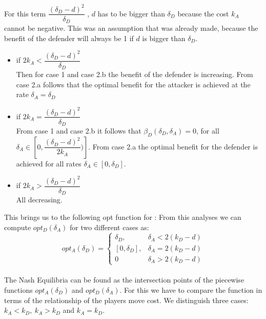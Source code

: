 For this term $\dfrac{(\delta_{D}-d)^{2}}{\delta_{D}} $ , $d$ has to be bigger than  $\delta_{D}$ because the cost $k_{A}$ cannot be negative. This was an assumption that was already made, because the benefit of the defender will always be 1 if $d$ is bigger than  $\delta_{D}$.
\begin{itemize}
\item if $2k_{A} < \dfrac{(\delta_{D}-d)^{2}}{\delta_{D}} $ \\
Then for case 1 and case 2.b the benefit of the defender is increasing. From case 2.a follows that the optimal benefit for the attacker is achieved at the rate $\delta_{A} = \delta_{D}$
\item if $2k_{A} = \dfrac{(\delta_{D}-d)^{2}}{\delta_{D}} $ \\
From case 1 and case 2.b it follows that $\beta_{D}(\delta_{D},\delta_{A})=0$, for all $\delta_{A} \in [0,\dfrac{(\delta_{D}-d)^{2}}{2k_{A}})]$. From case 2.a the optimal benefit for the defender is achieved for all rates $\delta_{A} \in [0, \delta_{D}]$.
\item if $2k_{A} > \dfrac{(\delta_{D}-d)^{2}}{\delta_{D}} $ \\
All decreasing.
\end{itemize}

This brings us to the following opt function for : 
From this analyses we can compute $opt_{D}(\delta_{A})$ for two different cases as:
 \begin{displaymath}
  opt_{A}(\delta_{D}) = \left\{
     \begin{array}{lr}
       \delta_{D}, & \delta_{A} < 2(k_{D} - d)\\
       \left[ 0, \delta_{D} \right],  & \delta_{A} = 2(k_{D} - d) \\
       0 & \delta_{A} > 2(k_{D} - d)
     \end{array}
   \right.
\end{displaymath}
\\

The Nash Equilibria can be found as the intersection points of the piecewise functions $opt_{A}(\delta_{D})$ and $opt_{D}(\delta_{A})$. For this we have to compare the function in terms of the relationship of the players move cost. We distinguish three cases: $k_{A} < k_{D} , ~k_{A} > k_{D} $ and $k_{A} = k_{D}$. 
